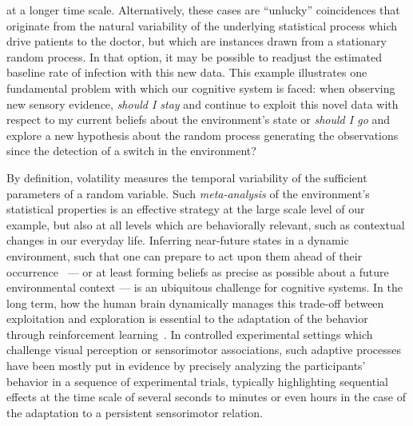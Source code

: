 \documentclass[12pt,english]{article}%
\newcommand{\citep}[1]{\parencite{#1}}
\begin{document}
at a longer time scale.
Alternatively, these cases are
``unlucky'' coincidences that originate from the natural variability
of the underlying statistical process which drive patients to the doctor,
but which are instances drawn from a stationary random process.
In that option, it may be possible to readjust
the estimated baseline rate of infection with this new data.
This example illustrates one fundamental problem
with which our cognitive system is faced:
when observing new sensory evidence,
\emph{should I stay} and continue to exploit this novel data
with respect to my current beliefs about the environment's state
or \emph{should I go} and explore a new hypothesis
about the random process generating the observations
since the detection of a switch in the environment?

By definition, volatility measures the temporal variability
of the sufficient parameters of a random variable.
Such \emph{meta-analysis} of the environment's statistical properties
is an effective strategy at the large scale level of our example,
but also at all levels which are behaviorally relevant,
such as contextual changes in our everyday life.
Inferring near-future states in a dynamic environment,
such that one can prepare to act upon them
ahead of their occurrence~\citep{PerrinetAdamasFriston2014} ---
or at least forming beliefs as precise as possible
about a future environmental context ---
is an ubiquitous challenge for cognitive systems.
In the long term, how the human brain dynamically manages
this trade-off between exploitation and exploration
is essential to the adaptation
of the behavior through reinforcement learning~\citep{Cohen2007}.
In controlled experimental settings which challenge visual perception or sensorimotor associations,
such adaptive processes have been mostly put in evidence
by precisely analyzing the participants' behavior in a sequence of experimental trials,
typically highlighting sequential effects
at the time scale of several seconds to minutes
or even hours in the case of the adaptation to a persistent sensorimotor relation.
\end{document}
